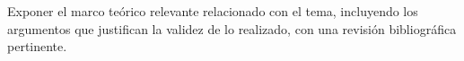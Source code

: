 Exponer el marco teórico relevante relacionado con el tema, incluyendo los argumentos que justifican la validez de lo realizado, con una revisión bibliográfica pertinente.